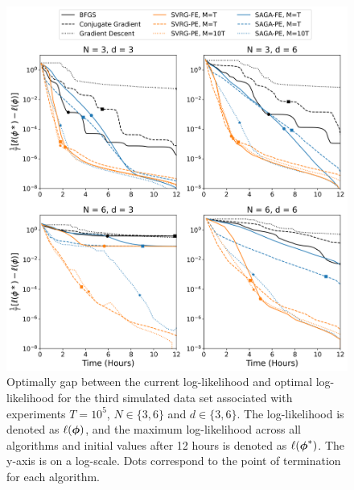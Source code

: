 \documentclass[12pt]{article}
\begin{document}
\begin{figure}[H]
    \centering
    \includegraphics[width=6.5in]{../plt/log-like_v_time_T-100000-002.png}
    \caption{Optimally gap between the current log-likelihood and optimal log-likelihood for the third simulated data set associated with experiments $T=10^{5}$, $N \in \{3,6\}$ and $d \in \{3,6\}$. The log-likelihood is denoted as $\ell(\boldsymbol{\phi})$, and the maximum log-likelihood across all algorithms and initial values after 12 hours is denoted as $\ell(\boldsymbol{\phi}^*)$. The y-axis is on a log-scale. Dots correspond to the point of termination for each algorithm.}
\end{figure}
%
\end{document}
